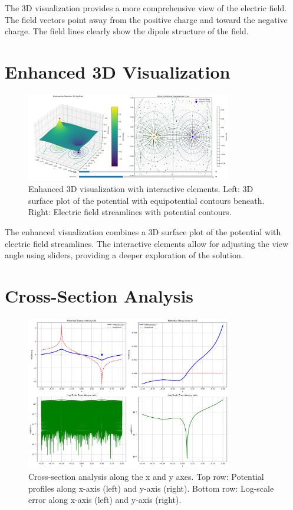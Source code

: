 \documentclass[12pt,a4paper]{report}
\begin{document}
	The 3D visualization provides a more comprehensive view of the electric field. The field vectors point away from the positive charge and toward the negative charge. The field lines clearly show the dipole structure of the field.
	
	\section{Enhanced 3D Visualization}
	\begin{figure}[H]
		\centering
		\includegraphics[width=0.8\textwidth]{enhanced_visualization.png}
		\caption{Enhanced 3D visualization with interactive elements. Left: 3D surface plot of the potential with equipotential contours beneath. Right: Electric field streamlines with potential contours.}
	\end{figure}
	
	The enhanced visualization combines a 3D surface plot of the potential with electric field streamlines. The interactive elements allow for adjusting the view angle using sliders, providing a deeper exploration of the solution.
	
	\section{Cross-Section Analysis}
	\begin{figure}[H]
		\centering
		\includegraphics[width=0.8\textwidth]{cross_section_analysis.png}
		\caption{Cross-section analysis along the x and y axes. Top row: Potential profiles along x-axis (left) and y-axis (right). Bottom row: Log-scale error along x-axis (left) and y-axis (right).}
	\end{figure}
	
\end{document}
